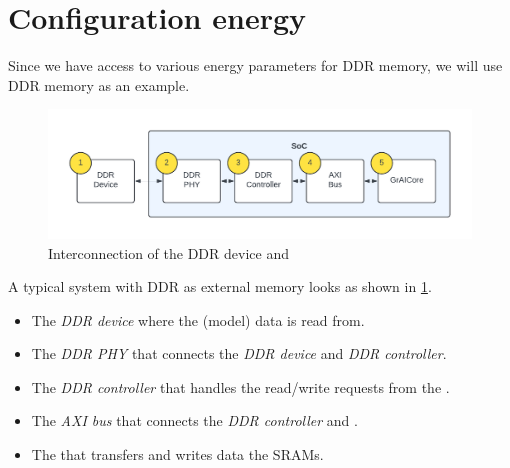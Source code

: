 \section{Configuration energy}
Since we have access to various energy parameters for DDR memory, we will use DDR memory as an example.

\begin{figure}[hbtp]
    \centering
    \includegraphics[width=0.8\linewidth]{assets/ddr_graicore_block_diagram.pdf}
    \caption{
        Interconnection of the DDR device and \graicore{}
    }
    \label{fig:ddr_graicore_block_diagram}
\end{figure}

A typical system with DDR as external memory looks as shown in \cref{fig:ddr_graicore_block_diagram}.
\begin{itemize}
    \item The \textit{DDR device} where the (model) data is read from.
    \item The \textit{DDR PHY} that connects the \textit{DDR device} and \textit{DDR controller}.
    \item The \textit{DDR controller} that handles the read/write requests from the \textit{\graicore{}}.
    \item The \textit{AXI bus} that connects the \textit{DDR controller} and \textit{\graicore{}}.
    \item The \textit{\graicore{}} that transfers and writes data the SRAMs.
\end{itemize}



